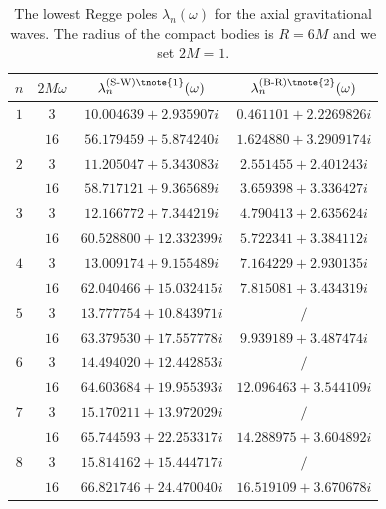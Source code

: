 \documentclass[aps,prd,longbibliography,reprint,twocolumn,amsmath,amssymb,amsfonts,showpacs,superscriptaddress]{revtex4-1}%
\begin{document}
\begingroup
\squeezetable
\begin{table}[htp]
\begin{threeparttable}[htp]
\caption{\label{tab:table3} The lowest Regge poles $\lambda_{n}(\omega)$ for the axial gravitational waves. The radius of the compact bodies is $R = 6M$ and we set $2M=1$.}
\smallskip
\centering
\begin{ruledtabular}
\begin{tabular}{cccc}
 $n$ & $2M\omega$  & $\lambda^{\text{(S-W)\tnote{1}}}_n(\omega)$ & $\lambda^{\text{(B-R)\tnote{2}}}_n(\omega)$
 \\ \hline
$1$  & $3$  & $10.004639+2.935907 i$  & $0.461101+2.2269826 i $   \\
     & $16$ & $56.179459+5.874240 i $ & $1.624880+3.2909174 i $
 \\

$2$  & $3$  & $11.205047+5.343083 i$  & $2.551455+2.401243 i $     \\
     & $16$ & $58.717121+9.365689 i  $& $3.659398+3.336427 i $
 \\

$3$  & $3$  & $12.166772+7.344219 i $  & $4.790413+2.635624 i  $     \\
     & $16$ & $60.528800+12.332399 i $ & $5.722341+3.384112 i $
 \\

$4$  & $3$  & $13.009174+9.155489 i  $  & $7.164229+2.930135 i $     \\
     & $16$ & $62.040466+15.032415 i  $ & $7.815081+3.434319 i  $
      \\

$5$  & $3$  & $13.777754+10.843971 i $  & $/ $   \\
     & $16$ & $63.379530+17.557778 i $  & $9.939189+3.487474 i $      \\

$6$  & $3$  & $14.494020+12.442853 i $  & $/ $      \\
     & $16$ & $64.603684+19.955393 i $  & $12.096463+3.544109 i  $
   \\

$7$  & $3$  & $15.170211+13.972029 i $  & $ /$       \\
     & $16$ & $65.744593+22.253317 i $  & $14.288975+3.604892 i $
         \\

$8$  & $3$  & $15.814162+15.444717 i $  & $/ $        \\
     & $16$ & $66.821746+24.470040 i $  & $16.519109+3.670678 i $
         \\


\end{tabular}
\end{ruledtabular}
\end{threeparttable}
\end{table}
\end{document}

